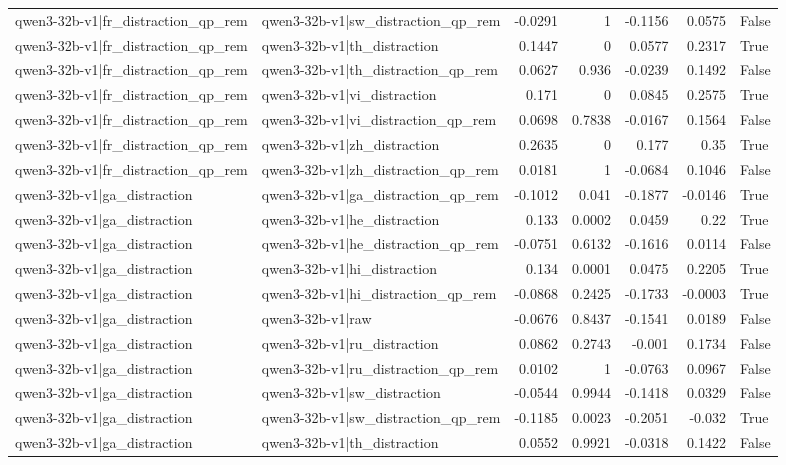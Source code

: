\begin{table}
\begin{tabular}{l l r r r r l}
qwen3-32b-v1|fr_distraction_qp_rem & qwen3-32b-v1|sw_distraction_qp_rem & -0.0291 & 1 & -0.1156 & 0.0575 & False \\
qwen3-32b-v1|fr_distraction_qp_rem & qwen3-32b-v1|th_distraction & 0.1447 & 0 & 0.0577 & 0.2317 & True \\
qwen3-32b-v1|fr_distraction_qp_rem & qwen3-32b-v1|th_distraction_qp_rem & 0.0627 & 0.936 & -0.0239 & 0.1492 & False \\
qwen3-32b-v1|fr_distraction_qp_rem & qwen3-32b-v1|vi_distraction & 0.171 & 0 & 0.0845 & 0.2575 & True \\
qwen3-32b-v1|fr_distraction_qp_rem & qwen3-32b-v1|vi_distraction_qp_rem & 0.0698 & 0.7838 & -0.0167 & 0.1564 & False \\
qwen3-32b-v1|fr_distraction_qp_rem & qwen3-32b-v1|zh_distraction & 0.2635 & 0 & 0.177 & 0.35 & True \\
qwen3-32b-v1|fr_distraction_qp_rem & qwen3-32b-v1|zh_distraction_qp_rem & 0.0181 & 1 & -0.0684 & 0.1046 & False \\
qwen3-32b-v1|ga_distraction & qwen3-32b-v1|ga_distraction_qp_rem & -0.1012 & 0.041 & -0.1877 & -0.0146 & True \\
qwen3-32b-v1|ga_distraction & qwen3-32b-v1|he_distraction & 0.133 & 0.0002 & 0.0459 & 0.22 & True \\
qwen3-32b-v1|ga_distraction & qwen3-32b-v1|he_distraction_qp_rem & -0.0751 & 0.6132 & -0.1616 & 0.0114 & False \\
qwen3-32b-v1|ga_distraction & qwen3-32b-v1|hi_distraction & 0.134 & 0.0001 & 0.0475 & 0.2205 & True \\
qwen3-32b-v1|ga_distraction & qwen3-32b-v1|hi_distraction_qp_rem & -0.0868 & 0.2425 & -0.1733 & -0.0003 & True \\
qwen3-32b-v1|ga_distraction & qwen3-32b-v1|raw & -0.0676 & 0.8437 & -0.1541 & 0.0189 & False \\
qwen3-32b-v1|ga_distraction & qwen3-32b-v1|ru_distraction & 0.0862 & 0.2743 & -0.001 & 0.1734 & False \\
qwen3-32b-v1|ga_distraction & qwen3-32b-v1|ru_distraction_qp_rem & 0.0102 & 1 & -0.0763 & 0.0967 & False \\
qwen3-32b-v1|ga_distraction & qwen3-32b-v1|sw_distraction & -0.0544 & 0.9944 & -0.1418 & 0.0329 & False \\
qwen3-32b-v1|ga_distraction & qwen3-32b-v1|sw_distraction_qp_rem & -0.1185 & 0.0023 & -0.2051 & -0.032 & True \\
qwen3-32b-v1|ga_distraction & qwen3-32b-v1|th_distraction & 0.0552 & 0.9921 & -0.0318 & 0.1422 & False \\

\end{tabular}
\end{table}
